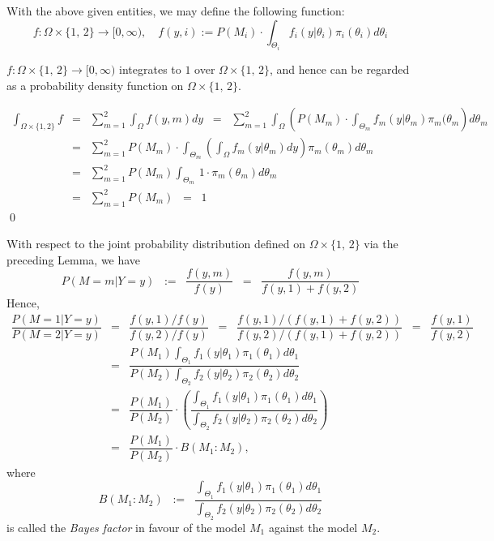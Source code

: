 \noindent
With the above given entities, we may define the following function:
\begin{equation*}
f : \Omega \times \{1,\,2\} \longrightarrow [0,\infty),
\quad
f(y,i) := P(M_{i})\cdot\int_{\Theta_{i}}f_{i}(y|\theta_{i})\pi_{i}(\theta_{i})d\theta_{i}
\end{equation*}

\begin{lemma}\quad
$f : \Omega\times\{1,\,2\} \longrightarrow [0,\infty)$ integrates to $1$ over $\Omega \times \{1,\,2\}$, and hence can be regarded as a probability density function on $\Omega \times \{1,\,2\}$.
\end{lemma}
\proof
\begin{eqnarray*}
\int_{\Omega\times\{1,2\}} f
&=& \sum^{2}_{m=1} \int_{\Omega} f(y,m)dy
\;\;=\;\; \sum^{2}_{m=1} \int_{\Omega}\left(P(M_{m})\cdot\int_{\Theta_{m}}f_{m}(y|\theta_{m})\pi_{m}(\theta_{m}\right)d\theta_{m} \\
&=& \sum^{2}_{m=1} P(M_{m})\cdot\int_{\Theta_{m}}\left(\int_{\Omega}f_{m}(y|\theta_{m})dy\right)\pi_{m}(\theta_{m})d\theta_{m} \\
&=& \sum^{2}_{m=1} P(M_{m})\int_{\Theta_{m}}\,1\cdot\pi_{m}(\theta_{m})d\theta_{m} \\
&=& \sum^{2}_{m=1} P(M_{m}) \;\; = \;\;1
\end{eqnarray*}
\qed

\noindent
With respect to the joint probability distribution defined on $\Omega \times \{1,\,2\}$ via the preceding Lemma, we have
\begin{equation*}
P(M = m|Y = y)
\;\; :=\;\; \dfrac{f(y,m)}{f(y)}
\;\; = \;\; \dfrac{f(y,m)}{f(y,1) + f(y,2)}
\end{equation*}
Hence,
\begin{eqnarray*}
\dfrac{P(M = 1|Y = y)}{P(M = 2|Y = y)}
& = & \dfrac{f(y,1)/f(y)}{f(y,2)/f(y)}
\;\; = \;\; \dfrac{f(y,1)/(f(y,1)+f(y,2))}{f(y,2)/(f(y,1)+f(y,2))}
\;\; = \;\; \dfrac{f(y,1)}{f(y,2)} \\
&=& \dfrac{P(M_{1})\int_{\Theta_{1}}f_{1}(y|\theta_{1})\pi_{1}(\theta_{1})d\theta_{1}}{P(M_{2})\int_{\Theta_{2}}f_{2}(y|\theta_{2})\pi_{2}(\theta_{2})d\theta_{2}} \\
&=& \dfrac{P(M_{1})}{P(M_{2})}\cdot
\left(\dfrac{\int_{\Theta_{1}}f_{1}(y|\theta_{1})\pi_{1}(\theta_{1})d\theta_{1}}{\int_{\Theta_{2}}f_{2}(y|\theta_{2})\pi_{2}(\theta_{2})d\theta_{2}}\right)\\
&=& \dfrac{P(M_{1})}{P(M_{2})}\cdot B\left(M_{1}:M_{2}\right),
\end{eqnarray*}
where
\begin{equation*}
B\left(M_{1}:M_{2}\right) \;\; := \;\;
\dfrac{\int_{\Theta_{1}}f_{1}(y|\theta_{1})\pi_{1}(\theta_{1})d\theta_{1}}{\int_{\Theta_{2}}f_{2}(y|\theta_{2})\pi_{2}(\theta_{2})d\theta_{2}}
\end{equation*}
is called the \textit{Bayes factor} in favour of the model $M_{1}$ against the model $M_{2}$.

